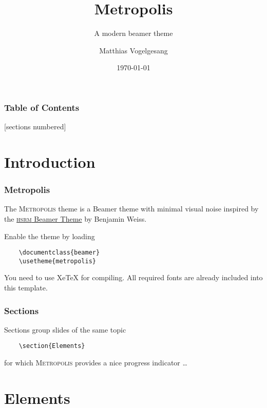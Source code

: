\documentclass[12pt]{beamer}
\title{Metropolis}
\subtitle{A modern beamer theme}
\date{\today}
\author{Matthias Vogelgesang}
\institute{Institute or miscellaneous information}
\begin{document}
\maketitle

\begin{frame}
\frametitle{Table of Contents}
[sections numbered]
\tableofcontents[hideallsubsections]
\end{frame}

\section{Introduction}

\begin{frame}[fragile]
\frametitle{Metropolis}

The \textsc{Metropolis} theme is a Beamer theme with minimal visual noise
inspired by the \href{https://github.com/hsrmbeamertheme/hsrmbeamertheme}{\textsc{hsrm} Beamer
Theme} by Benjamin Weiss.

  Enable the theme by loading
  
\begin{verbatim}
    \documentclass{beamer}
    \usetheme{metropolis}
\end{verbatim}

You need to use XeTeX for compiling. All required fonts are already included into this template.
\end{frame}

\begin{frame}[fragile]
\frametitle{Sections}
Sections group slides of the same topic

\begin{verbatim}    \section{Elements}\end{verbatim}

for which \textsc{Metropolis} provides a nice progress indicator \ldots
\end{frame}

\section{Elements}
\end{document}
